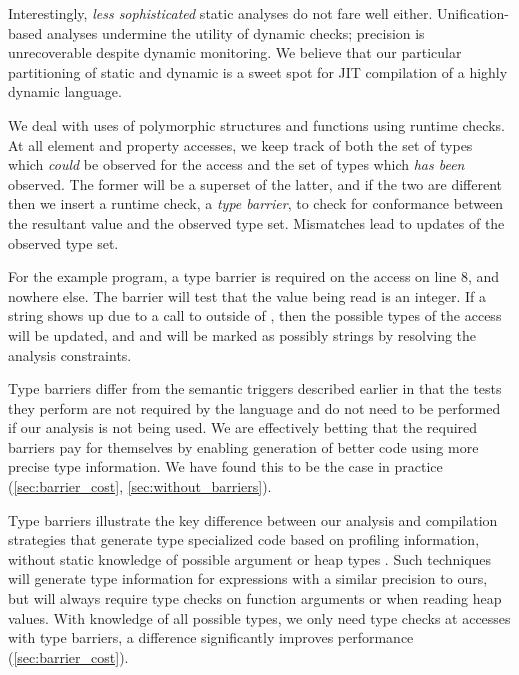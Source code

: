 Interestingly, \emph{less sophisticated} static
analyses do not fare well either. Unification-based analyses undermine the
utility of dynamic checks; precision is unrecoverable despite dynamic
monitoring. We believe that our particular partitioning of static and dynamic
is a sweet spot for JIT compilation of a highly dynamic language.

We deal with uses of polymorphic structures and functions using runtime checks.
At all element and property accesses, we keep track of both the set of
types which \emph{could} be observed for the access and the set of types
which \emph{has been} observed.
The former will be a superset of the latter, and if the two are different then
we insert a runtime check, a {\it type barrier}, to check for conformance
between the resultant value and the observed type set.
Mismatches lead to updates of the observed type set.

For the example program, a type barrier is required on the  access
on line 8, and nowhere else. The barrier will test that the value being read
is an integer. If a string shows up due to a call to 
outside of , then the possible types of the  access
will be updated, and  and  will be marked as possibly
strings by resolving the analysis constraints.

Type barriers differ from the semantic triggers described earlier in that
the tests they perform are not required by the language
and do not need to
be performed if our analysis is not being used.
We are effectively betting that the required barriers
pay for themselves by enabling generation of better code using more precise type information.
We have found this to be the case in practice (\Section\ref{sec:barrier_cost}, \Section\ref{sec:without_barriers}).

Type barriers illustrate the key difference between our analysis and
compilation strategies that generate type specialized code based on profiling
information, without static knowledge of possible argument or heap types
\cite{ChambersThesis, Chambers89}.
Such techniques will generate type information for expressions with a
similar precision to ours,
but will always require type checks on function arguments or when reading
heap values.
With knowledge of all possible types, we only need type checks at accesses
with type barriers, a difference significantly improves performance
(\Section\ref{sec:barrier_cost}).

